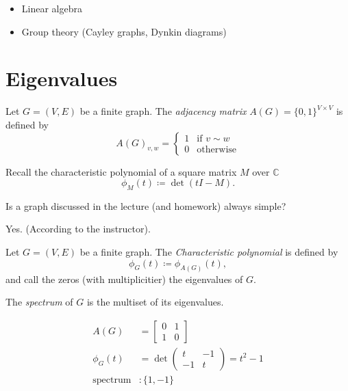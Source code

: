 \begin{itemize}
\item Linear algebra
\item Group theory (Cayley graphs, Dynkin diagrams)
\end{itemize}

\section{Eigenvalues}

\begin{definition}
Let \(G=(V,E)\) be a finite graph.
The \emph{adjacency matrix} \( A(G)=\{0,1\}^{V\times V} \) is defined by
\[ A(G)_{v,w}=\begin{cases} 1 & \text{if } v\sim w \\ 0 & \text{otherwise} \end{cases} \]
\end{definition}

Recall the characteristic polynomial of a square matrix \(M\) over \(\mathbb{C}\)
\[ \phi_M(t)\coloneqq \det(tI-M). \]

\begin{question}
Is a graph discussed in the lecture (and homework) always simple?
\end{question}
\begin{answer}
Yes. (According to the instructor).
\end{answer}

\begin{definition}
Let \(G=(V,E)\) be a finite graph.
The \emph{Characteristic polynomial} is defined by
\[ \phi_G(t)\coloneqq \phi_{A(G)}(t), \]
and call the zeros (with multiplicitier) the eigenvalues of \(G\).
\end{definition}

\begin{definition}[Spectrum]
The \emph{spectrum} of \(G\) is the multiset of its eigenvalues.
\end{definition}

\begin{example}[Spectrum]
\begin{align*}
A(G)&=\begin{bmatrix} 0 & 1 \\ 1 & 0 \end{bmatrix}\\
\phi_G(t)&=\det\begin{pmatrix} t & -1 \\ -1 & t \end{pmatrix}=t^2-1\\
\text{spectrum}&: \{1,-1\}
\end{align*}
\end{example}

